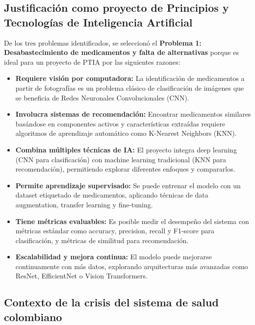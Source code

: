 \subsection{Justificación como proyecto de Principios y Tecnologías de Inteligencia Artificial}

De los tres problemas identificados, se seleccionó el \textbf{Problema 1: Desabastecimiento de medicamentos y falta de alternativas} porque es ideal para un proyecto de PTIA por las siguientes razones:

\begin{itemize}
	\item \textbf{Requiere visión por computadora:} La identificación de medicamentos a partir de fotografías es un problema clásico de clasificación de imágenes que se beneficia de Redes Neuronales Convolucionales (CNN).
	
	\item \textbf{Involucra sistemas de recomendación:} Encontrar medicamentos similares basándose en componentes activos y características extraídas requiere algoritmos de aprendizaje automático como K-Nearest Neighbors (KNN).
	
	\item \textbf{Combina múltiples técnicas de IA:} El proyecto integra deep learning (CNN para clasificación) con machine learning tradicional (KNN para recomendación), permitiendo explorar diferentes enfoques y compararlos.
	
	\item \textbf{Permite aprendizaje supervisado:} Se puede entrenar el modelo con un dataset etiquetado de medicamentos, aplicando técnicas de data augmentation, transfer learning y fine-tuning.
	
	\item \textbf{Tiene métricas evaluables:} Es posible medir el desempeño del sistema con métricas estándar como accuracy, precision, recall y F1-score para clasificación, y métricas de similitud para recomendación.
	
	\item \textbf{Escalabilidad y mejora continua:} El modelo puede mejorarse continuamente con más datos, explorando arquitecturas más avanzadas como ResNet, EfficientNet o Vision Transformers.
\end{itemize}

\subsection{Contexto de la crisis del sistema de salud colombiano}

